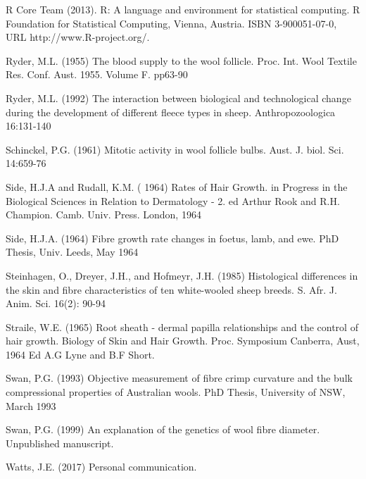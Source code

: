 \documentclass[titlepage]{article}  %
\begin{document}
\begin{thebibliography}{99}
R Core Team (2013). R: A language and environment for statistical
  computing. R Foundation for Statistical Computing, Vienna, Austria.
  ISBN 3-900051-07-0, URL http://www.R-project.org/.

Ryder, M.L. (1955) The blood supply to the wool follicle. Proc. Int. Wool Textile Res. Conf. Aust. 1955. Volume F. pp63-90

Ryder, M.L. (1992) The interaction between biological and technological change during the development of different fleece types in sheep. Anthropozoologica 16:131-140

Schinckel, P.G. (1961) Mitotic activity in wool follicle bulbs. Aust. J. biol. Sci. 14:659-76

Side, H.J.A and Rudall, K.M. ( 1964) Rates of Hair Growth. in Progress in the Biological Sciences in Relation to Dermatology - 2. ed Arthur Rook and R.H. Champion. Camb. Univ. Press. London, 1964

Side, H.J.A. (1964) Fibre growth rate changes in foetus, lamb, and ewe. PhD Thesis, Univ. Leeds, May 1964

Steinhagen, O., Dreyer, J.H., and Hofmeyr, J.H. (1985) Histological differences in the skin and fibre characteristics of ten white-wooled sheep breeds. S. Afr. J. Anim. Sci. 16(2): 90-94

Straile, W.E. (1965) Root sheath - dermal papilla relationships and the control of hair growth. Biology of Skin and Hair Growth.  Proc. Symposium Canberra, Aust, 1964 Ed A.G Lyne and B.F Short.

Swan, P.G. (1993) Objective measurement of fibre crimp curvature and the bulk compressional properties of Australian wools. PhD Thesis, University of NSW, March 1993 

Swan, P.G. (1999) An explanation of the genetics of wool fibre diameter. Unpublished manuscript.

Watts, J.E. (2017) Personal communication.


\end{thebibliography}
\end{document}
